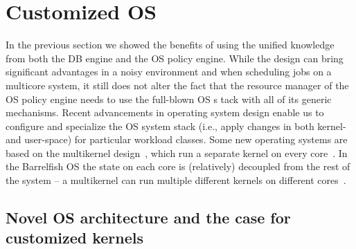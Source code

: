 \documentclass[11pt]{article}
\begin{document}
%

\section{Customized OS}
\label{sec:basslet}

In the previous section we showed the benefits of using the unified knowledge from 
both the DB engine and the OS policy engine. While the design can bring significant advantages 
in a noisy environment and when scheduling jobs on a multicore system, it still does not alter
the fact that the resource manager of the OS policy engine needs to use the full-blown OS s
tack with all of its generic mechanisms. 
Recent advancements in operating system design enable us to
configure and specialize the OS system stack (i.e., apply changes in both kernel- and user-space)
for particular workload classes. Some new operating systems are based on the multikernel
design~\cite{baumann:sosp09}, which run a separate kernel on every 
core~\cite{barrelfish,fos:osr09,Chapin:sosp95}. In the Barrelfish OS the state on each core is 
(relatively) decoupled from the rest of the system -- a multikernel can run multiple different 
kernels on different cores~\cite{zellweger:osdi14}.

\subsection{Novel OS architecture and the case for customized kernels}
\end{document}
